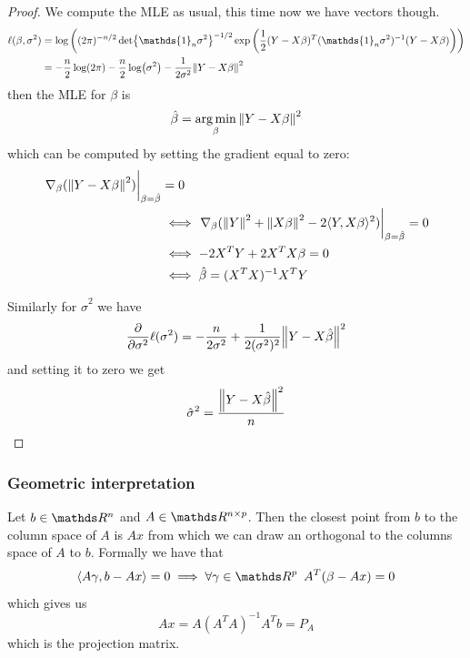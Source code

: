 \documentclass[12pt]{extarticle}
\begin{document}
\begin{proof}
	We compute the MLE as usual, this time now we have vectors though.
	\begin{align}
		\ell(\beta, \sigma^2) & = \log\left( (2\pi)^{-n/2} \det{\mathds{1}_n \sigma^2}^{-1/2} \exp\left( \frac{1}{2} (Y-X\beta)^T(\mathds{1}_n \sigma^2)^{-1}(Y - X \beta) \right) \right) \\
		                      & = -\frac{n}{2} \log(2 \pi) - \frac{n}{2} \log(\sigma^2) - \frac{1}{2\sigma^2} \norm{Y - X \beta}^2
	\end{align}
	then the MLE for $\beta$ is
	\begin{equation}
		\hat \beta = \operatorname*{arg\,min}_{\beta} \norm{Y - X\beta}^2
	\end{equation}
	which can be computed by setting the gradient equal to zero:
	\begin{align}
		\eval{\nabla_\beta (\norm{Y - X\beta}^2)}_{\beta = \hat \beta} & = 0                                                                                                               \\
		                                                               & \iff \eval{\nabla_\beta (\norm{Y}^2 + \norm{X \beta}^2 - 2 \langle Y, X\beta \rangle^2)}_{\beta = \hat \beta} = 0 \\
		                                                               & \iff -2 X^T Y + 2 X^T X \beta = 0                                                                                 \\
		                                                               & \iff \hat \beta = (X^T X)^{-1} X^T Y
	\end{align}

	Similarly for $\hat \sigma^2$ we have
	\begin{equation}
		\pdv{\sigma^2} \ell(\sigma^2) = - \frac{n}{2\sigma^2} + \frac{1}{2 (\sigma^2)^2} \norm{Y - X \hat \beta}^2
	\end{equation}
	and setting it to zero we get
	\begin{equation}
		\hat \sigma^2 = \frac{\norm{Y- X \hat \beta}^2}{n}
	\end{equation}
\end{proof}

\subsubsection{Geometric interpretation}
Let $b \in \R^n$ and $A \in \R^{n \times p}$.
Then the closest point from $b$ to the column space of $A$ is $Ax$
from which we can draw an orthogonal to the columns space of $A$ to $b$.
Formally we have that
\begin{equation}
	\langle A\gamma , b - Ax \rangle = 0 \implies \forall \gamma \in \R^p \enspace A^T(\beta -Ax) = 0
\end{equation}
which gives us
\begin{equation}
	A x = A (A ^T A)^{-1} A^T b = P_A
\end{equation}
which is the projection matrix.
\end{document}
